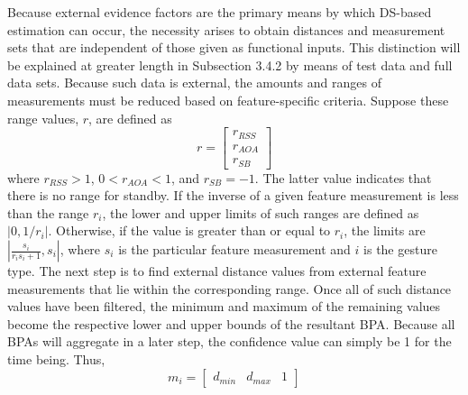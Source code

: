\documentclass[12pt]{uthesis-v12}  %
\begin{document}
Because external evidence factors are the primary means by which DS-based estimation can occur, the necessity arises to obtain distances and measurement sets that are independent of those given as functional inputs. This distinction will be explained at greater length in Subsection 3.4.2 by means of test data and full data sets. Because such data is external, the amounts and ranges of measurements must be reduced based on feature-specific criteria. Suppose these range values, $r$, are defined as
\begin{equation}
r = \begin{bmatrix*}
r_{RSS} \\
r_{AOA} \\
r_{SB} \end{bmatrix*}
\label{range}
\end{equation}
\noindent where $r_{RSS} > 1$, $0 < r_{AOA} < 1$, and $r_{SB} = -1 $. The latter value indicates that there is no range for standby. If the inverse of a given feature measurement is less than the range $r_i$, the lower and upper limits of such ranges are defined as $|0,1/r_i|$.  Otherwise, if the value is greater than or equal to $r_i$, the limits are $|\frac{s_i}{r_is_i+1},s_i|$, where $s_i$ is the particular feature measurement and $i$ is the gesture type. The next step is to find external distance values from external feature measurements that lie within the corresponding range. Once all of such distance values have been filtered, the minimum and maximum of the remaining values become the respective lower and upper bounds of the resultant BPA. Because all BPAs will aggregate in a later step, the confidence value can simply be 1 for the time being. Thus,
\begin{equation}
m_i = \begin{bmatrix*}
d_{min} & d_{max} & 1 \end{bmatrix*}
\label{bpa-d}
\end{equation}
\end{document}

